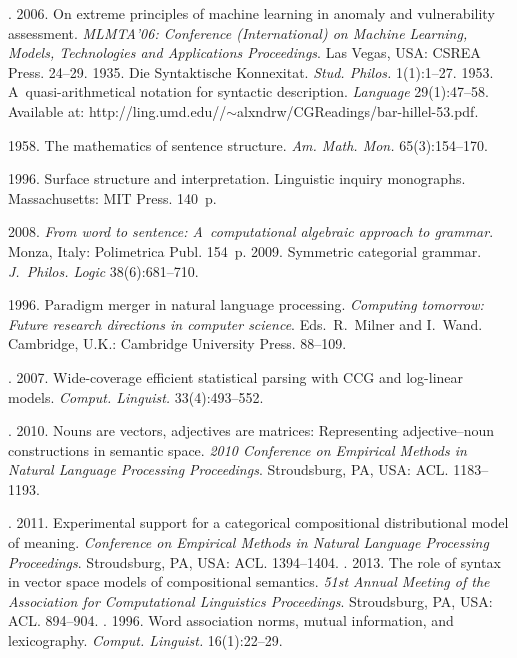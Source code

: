 \begin{multicols}{2}
{{\begin{thebibliography}{99}
. 2006. 
On extreme principles of machine learning in anomaly and vulnerability assessment. 
\textit{MLMTA'06:  Conference (International) on Machine Learning, Models, 
Technologies and Applications Proceedings}. Las Vegas, USA: CSREA Press. 24--29.
 1935. Die Syntaktische Konnexitat. 
\textit{Stud. Philos.} 1(1):1--27. 
 1953. A~quasi-arithmetical notation for syntactic description. 
\textit{Language} 29(1):47--58. 
Available at:  {\sf http://ling.umd.edu//$\sim$alxndrw/CGReadings/bar-hillel-53.pdf}.

 1958. The mathematics of sentence structure. 
\textit{Am. Math. Mon.} 65(3):154--170.

 1996. Surface structure and interpretation. 
Linguistic inquiry monographs. Massachusetts: MIT Press. 140~p.


 2008. \textit{From word to sentence: A~computational algebraic approach 
to grammar}. 
Monza, Italy: Polimetrica Publ. 154~p. 
 2009. Symmetric categorial grammar. 
\textit{J.~Philos. Logic} 38(6):681--710.

 1996. Paradigm merger in natural language processing. 
\textit{Computing tomorrow: Future research directions in computer science}. 
Eds.\ R.~Milner and I.~Wand. Cambridge, U.K.: Cambridge University Press. 88--109.

\pagebreak

. 2007. Wide-coverage efficient 
statistical parsing with CCG and log-linear models. 
\textit{Comput. Linguist.} 33(4):493--552.



. 2010. Nouns are vectors, adjectives are matrices: 
Representing adjective--noun constructions in semantic space. 
\textit{2010 Conference on Empirical Methods in Natural Language Processing
Proceedings}. Stroudsburg, PA, USA: ACL. 1183--1193.

. 2011.
Experimental support for a categorical compositional distributional model of meaning. 
\textit{Conference on Empirical Methods in Natural Language Processing Proceedings}.
Stroudsburg, PA, USA: ACL. 1394--1404.
. 2013. 
The role of syntax in vector space models of compositional semantics. 
\textit{51st Annual Meeting of the Association for Computational Linguistics
Proceedings}. Stroudsburg, PA, USA: ACL. 894--904.
. 1996. 
Word association norms, mutual information, and lexicography. 
\textit{Comput. Linguist.} 16(1):22--29.


\end{thebibliography}}}
\end{multicols}
